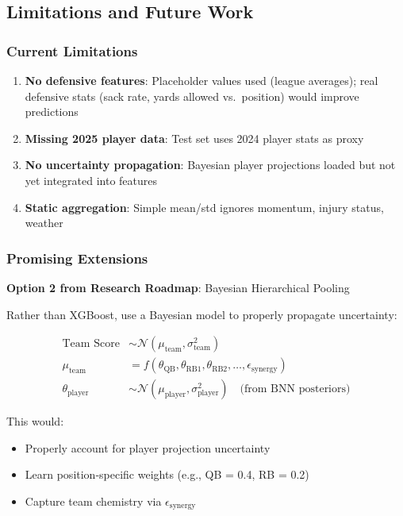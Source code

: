 \subsection{Limitations and Future Work}

\subsubsection{Current Limitations}

\begin{enumerate}
    \item \textbf{No defensive features}: Placeholder values used (league averages); real defensive stats (sack rate, yards allowed vs.\ position) would improve predictions
    \item \textbf{Missing 2025 player data}: Test set uses 2024 player stats as proxy
    \item \textbf{No uncertainty propagation}: Bayesian player projections loaded but not yet integrated into features
    \item \textbf{Static aggregation}: Simple mean/std ignores momentum, injury status, weather
\end{enumerate}

\subsubsection{Promising Extensions}

\textbf{Option 2 from Research Roadmap}: Bayesian Hierarchical Pooling

Rather than XGBoost, use a Bayesian model to properly propagate uncertainty:

\begin{align*}
\text{Team Score} &\sim \mathcal{N}(\mu_{\text{team}}, \sigma^2_{\text{team}}) \\
\mu_{\text{team}} &= f(\theta_{\text{QB}}, \theta_{\text{RB1}}, \theta_{\text{RB2}}, \ldots, \epsilon_{\text{synergy}}) \\
\theta_{\text{player}} &\sim \mathcal{N}(\mu_{\text{player}}, \sigma^2_{\text{player}}) \quad \text{(from BNN posteriors)}
\end{align*}

This would:
\begin{itemize}
    \item Properly account for player projection uncertainty
    \item Learn position-specific weights (e.g., QB = 0.4, RB = 0.2)
    \item Capture team chemistry via $\epsilon_{\text{synergy}}$
\end{itemize}

